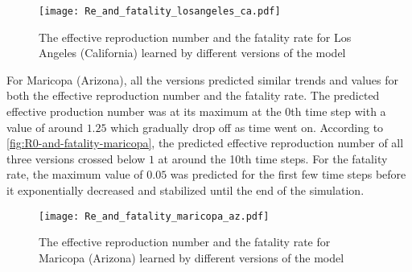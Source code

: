 \begin{figure}[!htb]
    \centering
    \texttt{[image: Re\_and\_fatality\_losangeles\_ca.pdf]}
    \caption{The effective reproduction number and the fatality rate for Los Angeles (California) learned by different versions of the model}
    \label{fig:R0-and-fatality-losangeles}
\end{figure}

For Maricopa (Arizona), all the versions predicted similar trends and values for both the effective reproduction number and the fatality rate.
The predicted effective production number was at its maximum at the 0th time step with a value of around $1.25$ which gradually drop off as time went on.
According to \autoref{fig:R0-and-fatality-maricopa}, the predicted effective reproduction number of all three versions crossed below $1$ at around the 10th time steps.
For the fatality rate, the maximum value of $0.05$ was predicted for the first few time steps before it exponentially decreased and stabilized until the end of the simulation.

\begin{figure}[!htb]
    \centering
    \texttt{[image: Re\_and\_fatality\_maricopa\_az.pdf]}
    \caption{The effective reproduction number and the fatality rate for Maricopa (Arizona) learned by different versions of the model}
    \label{fig:R0-and-fatality-maricopa}
\end{figure}
